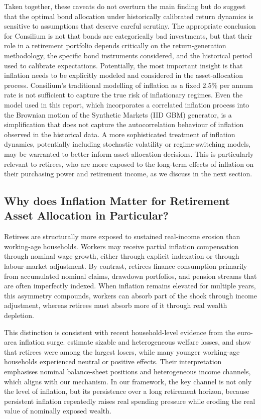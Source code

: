 \documentclass[11pt]{article}
\begin{document}
Taken together, these caveats do not overturn the main finding but do suggest that the optimal bond allocation under historically calibrated return dynamics is sensitive to assumptions that deserve careful scrutiny. The appropriate conclusion for Consilium is not that bonds are categorically bad investments, but that their role in a retirement portfolio depends critically on the return-generation methodology, the specific bond instruments considered, and the historical period used to calibrate expectations. Potentially, the most important insight is that inflation needs to be explicitly modeled and considered in the asset-allocation process. Consilium's traditional modelling of inflation as a fixed 2.5\% per annum rate is not sufficient to capture the true risk of inflationary regimes. Even the model used in this report, which incorporates a correlated inflation process into the Brownian motion of the Synthetic Markets (IID GBM) generator, is a simplification that does not capture the autocorrelation behaviour of inflation observed in the historical data. A more sophisticated treatment of inflation dynamics, potentially including stochastic volatility or regime-switching models, may be warranted to better inform asset-allocation decisions. This is particularly relevant to retirees, who are more exposed to the long-term effects of inflation on their purchasing power and retirement income, as we discuss in the next section.


\subsection{Why does Inflation Matter for Retirement Asset Allocation in Particular?}

Retirees are structurally more exposed to sustained real-income erosion than working-age households. Workers may receive partial inflation compensation through nominal wage growth, either through explicit indexation or through labour-market adjustment. By contrast, retirees finance consumption primarily from accumulated nominal claims, drawdown portfolios, and pension streams that are often imperfectly indexed. When inflation remains elevated for multiple years, this asymmetry compounds, workers can absorb part of the shock through income adjustment, whereas retirees must absorb more of it through real wealth depletion.

This distinction is consistent with recent household-level evidence from the euro-area inflation surge. \textcite{pallotti2024inflation} estimate sizable and heterogeneous welfare losses, and show that retirees were among the largest losers, while many younger working-age households experienced neutral or positive effects. Their interpretation emphasises nominal balance-sheet positions and heterogeneous income channels, which aligns with our mechanism. In our framework, the key channel is not only the level of inflation, but its persistence over a long retirement horizon, because persistent inflation repeatedly raises real spending pressure while eroding the real value of nominally exposed wealth.
\end{document}
